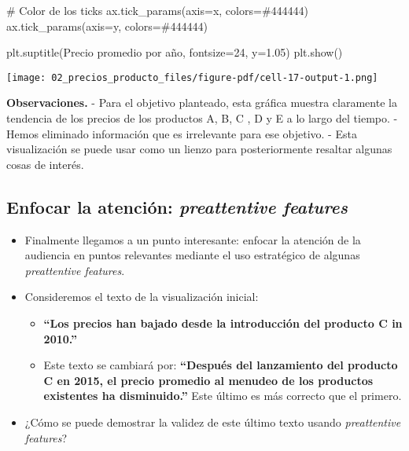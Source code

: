 \documentclass[
  letterpaper,
  DIV=11,
  numbers=noendperiod]{scrreprt}
\newenvironment{Shaded}{\begin{snugshade}}{\end{snugshade}}
\newcommand{\CommentTok}[1]{\textcolor[rgb]{0.37,0.37,0.37}{#1}}
\newcommand{\DecValTok}[1]{\textcolor[rgb]{0.68,0.00,0.00}{#1}}
\newcommand{\FloatTok}[1]{\textcolor[rgb]{0.68,0.00,0.00}{#1}}
\newcommand{\NormalTok}[1]{\textcolor[rgb]{0.00,0.23,0.31}{#1}}
\newcommand{\OperatorTok}[1]{\textcolor[rgb]{0.37,0.37,0.37}{#1}}
\newcommand{\StringTok}[1]{\textcolor[rgb]{0.13,0.47,0.30}{#1}}
\providecommand{\tightlist}{%
  \setlength{\itemsep}{0pt}\setlength{\parskip}{0pt}}\usepackage{longtable,booktabs,array}
\begin{document}
\begin{Shaded}
\begin{Highlighting}[]
\CommentTok{\# Color de los ticks}
\NormalTok{ax.tick\_params(axis}\OperatorTok{=}\StringTok{\textquotesingle{}x\textquotesingle{}}\NormalTok{, colors}\OperatorTok{=}\StringTok{\textquotesingle{}\#444444\textquotesingle{}}\NormalTok{)}
\NormalTok{ax.tick\_params(axis}\OperatorTok{=}\StringTok{\textquotesingle{}y\textquotesingle{}}\NormalTok{, colors}\OperatorTok{=}\StringTok{\textquotesingle{}\#444444\textquotesingle{}}\NormalTok{)}

\NormalTok{plt.suptitle(}\StringTok{\textquotesingle{}Precio promedio por año\textquotesingle{}}\NormalTok{, fontsize}\OperatorTok{=}\DecValTok{24}\NormalTok{, y}\OperatorTok{=}\FloatTok{1.05}\NormalTok{)}
\NormalTok{plt.show()}
\end{Highlighting}
\end{Shaded}

\texttt{[image: 02\_precios\_producto\_files/figure-pdf/cell-17-output-1.png]}

\textbf{Observaciones.} - Para el objetivo planteado, esta gráfica
muestra claramente la tendencia de los precios de los productos A, B, C
, D y E a lo largo del tiempo. - Hemos eliminado información que es
irrelevante para ese objetivo. - Esta visualización se puede usar como
un lienzo para posteriormente resaltar algunas cosas de interés.

\subsection{\texorpdfstring{Enfocar la atención: \emph{preattentive
features}}{Enfocar la atención: preattentive features}}\label{enfocar-la-atenciuxf3n-preattentive-features}

\begin{itemize}
\tightlist
\item
  Finalmente llegamos a un punto interesante: enfocar la atención de la
  audiencia en puntos relevantes mediante el uso estratégico de algunas
  \emph{preattentive features}.
\item
  Consideremos el texto de la visualización inicial:

  \begin{itemize}
  \tightlist
  \item
    \textbf{``Los precios han bajado desde la introducción del producto
    C in 2010.''}
  \item
    Este texto se cambiará por: \textbf{``Después del lanzamiento del
    producto C en 2015, el precio promedio al menudeo de los productos
    existentes ha disminuido.''} Este último es más correcto que el
    primero.
  \end{itemize}
\item
  ¿Cómo se puede demostrar la validez de este último texto usando
  \emph{preattentive features}?
\end{itemize}
\end{document}
